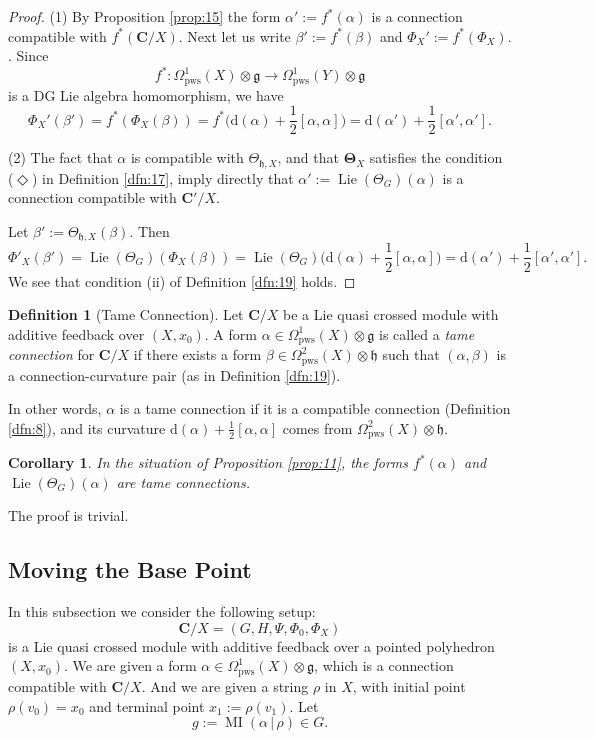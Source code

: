 \documentclass[10pt, a4paper]{amsart}
\newtheorem{cor}[equation]{Corollary}
\theoremstyle{definition}
\newtheorem{dfn}[equation]{Definition}
\numberwithin{equation}{section}
\newcommand{\opn}{\operatorname}
\newcommand{\mfrak}[1]{\mathfrak{#1}}
\newcommand{\mbf}[1]{\mathbf{#1}}
\newcommand{\mrm}[1]{\mathrm{#1}}
\newcommand{\smfrac}[2]{{\textstyle \frac{#1}{#2}}}
\newcommand{\tup}[1]{\textup{#1}}
\newcommand{\bsym}[1]{\boldsymbol{#1}}
\renewcommand{\vert}{\, | \,}
\newcommand{\g}{\mfrak{g}}
\newcommand{\h}{\mfrak{h}}
\renewcommand{\d}{\mrm{d}}
\begin{document}
\begin{proof}
(1) By Proposition \ref{prop:15} the form $\alpha' := f^*(\alpha)$ is a
connection compatible with $f^* (\mbf{C} / X)$.
Next let us write $\beta' := f^*(\beta)$ and 
$\Phi_X' := f^*(\Phi_X)$. . Since  
\[ f^* : \Omega^1_{\mrm{pws}}(X) \otimes \g \to 
\Omega^1_{\mrm{pws}}(Y) \otimes \g \]
is a DG Lie algebra homomorphism, we have
\[ \Phi_X'(\beta') = f^*(\Phi_X(\beta)) 
= f^* \bigl( \d (\alpha) + \smfrac{1}{2} [\alpha, \alpha] \bigr) 
= \d (\alpha') + \smfrac{1}{2} [\alpha', \alpha'] . \]

\medskip \noindent
(2) The fact that $\alpha$ is compatible with $\Theta_{\h, X}$, 
and that $\bsym{\Theta}_X$ satisfies the condition ($\Diamond$) in Definition
\ref{dfn:17}, imply directly that $\alpha' := \opn{Lie}(\Theta_G)(\alpha)$ is a
connection compatible with $\mbf{C}' / X$.

Let $\beta' := \Theta_{\h, X}(\beta)$. Then
\[ \Phi'_X(\beta') = \opn{Lie}(\Theta_G)(\Phi_X(\beta)) = 
\opn{Lie}(\Theta_G) \bigl( \d (\alpha) + \smfrac{1}{2} [\alpha, \alpha] \bigr)
= \d (\alpha') + \smfrac{1}{2} [\alpha', \alpha'] . \]
We see that condition (ii) of Definition \ref{dfn:19} holds.
\end{proof}

\begin{dfn}[Tame Connection] \label{dfn:46}
Let $\mbf{C} / X$ be a Lie quasi crossed module with additive feedback over
$(X, x_0)$. A form
$\alpha \in \Omega^1_{\mrm{pws}}(X) \otimes \g$
is called a {\em tame connection} 
for $\mbf{C} / X$ if there exists a form
$\beta \in \Omega^2_{\mrm{pws}}(X) \otimes \h$ 
such that $(\alpha, \beta)$ is a connection-curvature pair 
(as in Definition \ref{dfn:19}). 
\end{dfn}

In other words, $\alpha$ is a tame connection if it is a compatible connection
(Definition \ref{dfn:8}), and its curvature
$\d (\alpha) + \smfrac{1}{2} [\alpha, \alpha]$
comes from $\Omega^2_{\mrm{pws}}(X) \otimes \h$.

\begin{cor} \label{cor:8}
In the situation of Proposition \tup{\ref{prop:11}}, the forms 
$f^*(\alpha)$ and $\opn{Lie}(\Theta_G)(\alpha)$ are tame connections.
\end{cor}

The proof is trivial. 





\subsection{Moving the Base Point}
\label{subsec:moving}
In this subsection we consider the following setup: 
\[ \mbf{C} / X = (G, H, \Psi, \Phi_0, \Phi_X) \]
is a Lie quasi crossed module with additive feedback over a pointed 
polyhedron $(X, x_0)$. We are given a form
$\alpha \in \Omega^1_{\mrm{pws}}(X) \otimes \g$, which is a connection
compatible with $\mbf{C} / X$. And we are given a string $\rho$ in $X$, with
initial point $\rho(v_0) = x_0$ and terminal point $x_1 := \rho(v_1)$.
Let 
\[ g := \opn{MI}(\alpha \vert \rho) \in G . \]
\end{document}
